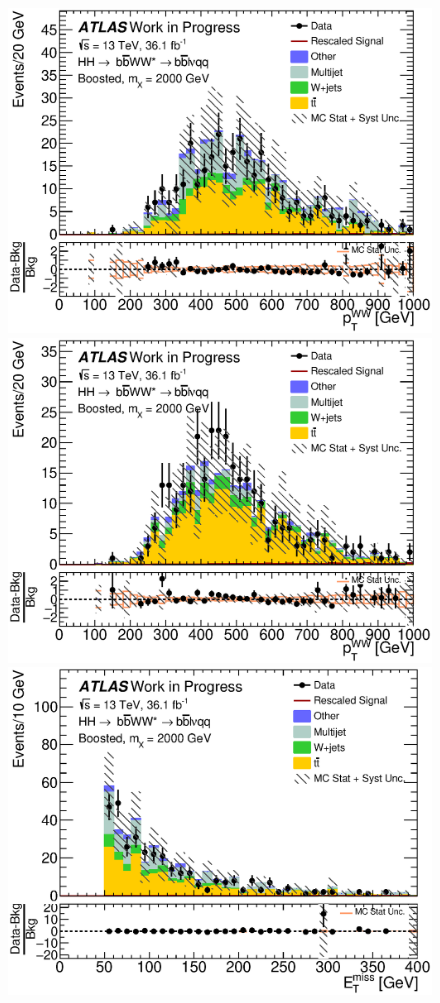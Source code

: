 \begin{figure}[H]
\begin{center}
\includegraphics[scale=0.33]{figures/kinplots/C_2tag_mbbcr_elec_presel_met50_WWPt}
\includegraphics[scale=0.33]{figures/kinplots/C_2tag_mbbcr_muon_presel_met50_WWPt}\\
\includegraphics[scale=0.33]{figures/kinplots/C_2tag_mbbcr_elec_presel_met50_MET}

\end{center}
\end{figure}
